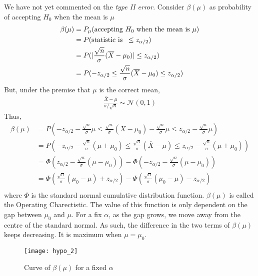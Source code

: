 \documentclass[../probability-notes.tex]{subfiles}
\begin{document}
    We have not yet commented on the \emph{type II error}. Consider $\beta(\mu)$ as probability of accepting $H_{0}$ when the mean is $\mu$
    \begin{align*}
        \beta(\mu) &= P_{\mu}(\text{accepting $H_{0}$ when the mean is $\mu$})\\
        &= P(\text{statistic is \:} \leq z_{\alpha/2})\\
        &= P(|\frac{\sqrt{n}}{\sigma}(\overline{X} - \mu_{0})| \leq z_{\alpha/2})\\
        &= P(-z_{\alpha/2} \leq \frac{\sqrt{n}}{\sigma}(\overline{X} - \mu_{0}) \leq z_{\alpha/2})
    \end{align*}
    But, under the premise that $\mu$ is the correct mean,
    \begin{align*}
        \frac{\overline{X} - \mu}{\sigma/\sqrt{n}} \sim \mathcal{N}(0, 1)
    \end{align*}
    Thus,
    \begin{align*}
        \beta(\mu) &= P(-z_{\alpha/2} - \frac{\sqrt{n}}{\sigma}\mu \leq \frac{\sqrt{n}}{\sigma}(\overline{X} - \mu_{0}) - \frac{\sqrt{n}}{\sigma}\mu \leq z_{\alpha/2} - \frac{\sqrt{n}}{\sigma}\mu)\\
        &= P(-z_{\alpha/2} - \frac{\sqrt{n}}{\sigma}(\mu + \mu_{0}) \leq \frac{\sqrt{n}}{\sigma}(\overline{X} - \mu) \leq z_{\alpha/2} - \frac{\sqrt{n}}{\sigma}(\mu + \mu_{0}))\\
        &= \Phi(z_{\alpha/2} - \frac{\sqrt{n}}{\sigma}(\mu - \mu_{0})) - \Phi(-z_{\alpha/2} - \frac{\sqrt{n}}{\sigma}(\mu - \mu_{0}))\\
        &= \Phi(\frac{\sqrt{n}}{\sigma}(\mu_{0} - \mu) +z_{\alpha/2}) - \Phi(\frac{\sqrt{n}}{\sigma}(\mu_{0} - \mu) -z_{\alpha/2})\\
    \end{align*}
    where $\Phi$ is the standard normal cumulative distribution function.\newline
    $\beta(\mu)$ is called the Operating Charectistic. The value of this function is only dependent on the gap between $\mu_{0}$ and $\mu$. For a fix $\alpha$, as the gap grows, we move away from the centre of the standard normal. As such, the difference in the two terms of $\beta(\mu)$ keeps decreasing. It is maximum when $\mu = \mu_{0}$.

    \begin{figure}[h]
    \texttt{[image: hypo\_2]}
    \centering
    \caption{Curve of $\beta(\mu)$ for a fixed $\alpha$}
    \label{fig:hypo_2} %
    \end{figure}
\end{document}
